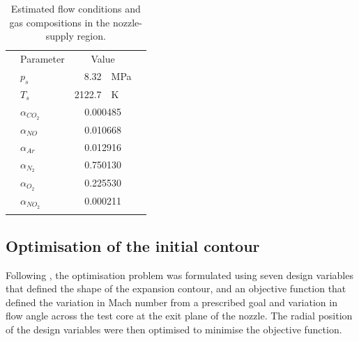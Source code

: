 \documentclass[12pt,a4paper]{article}
\begin{document}
\begin{table}[htbp]
 \begin{small}
  \begin{center}
  \caption{Estimated flow conditions and gas compositions in the nozzle-supply region.}
  \label{t:supply-conditions}
  \vspace{2mm}
  \begin{tabular}{@{}c@{}@{}l@{}@{}r@{}@{}l@{}@{}c@{}@{}}
  \hline\hline\noalign{\smallskip}
  \hspace{5mm}   &  Parameter \hspace{5mm}  &   \multicolumn{2}{c}{Value}  & \hspace{5mm}    \\
  \noalign{\smallskip}\hline\noalign{\smallskip}
  & $p_{s}$         & 8.32    & \hspace{1mm} MPa   &  \\
  & $T_{s}$         & 2122.7  & \hspace{1mm} K     &  \\
  & $\alpha_{CO_2}$ & \multicolumn{2}{c}{0.000485}         &  \\
  & $\alpha_{NO}$   & \multicolumn{2}{c}{0.010668}         &  \\
  & $\alpha_{Ar}$   & \multicolumn{2}{c}{0.012916}         &  \\
  & $\alpha_{N_2}$  & \multicolumn{2}{c}{0.750130}         &  \\
  & $\alpha_{O_2}$  & \multicolumn{2}{c}{0.225530}         &  \\
  & $\alpha_{NO_2}$ & \multicolumn{2}{c}{0.000211}         &  \\
  \noalign{\smallskip}\hline\hline
  \end{tabular}
  \end{center}
 \end{small}
\end{table}


\subsection{Optimisation of the initial contour}
\label{sec:nozzle-design:optimisation}
%
Following , the optimisation problem was formulated 
using seven design variables that defined the shape of the expansion contour, 
and an objective function that defined the variation in Mach number from a 
prescribed goal and variation in flow angle across the test core at the exit 
plane of the nozzle. The radial position of the design variables were then 
optimised to minimise the objective function.
\end{document}
